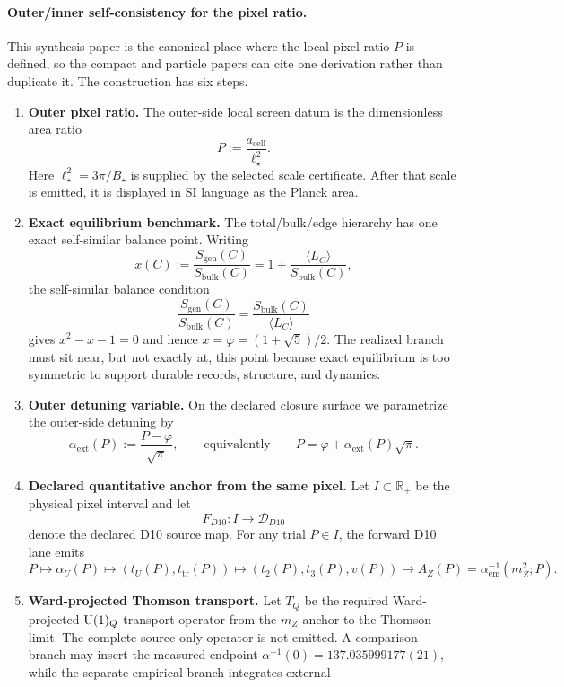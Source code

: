 \paragraph{Outer/inner self-consistency for the pixel ratio.}\label{sec:p-closure}
This synthesis paper is the canonical place where the local pixel ratio \(P\) is defined, so the
compact and particle papers can cite one derivation rather than duplicate it. The construction has
six steps.
\begin{enumerate}[leftmargin=2em]
\item \textbf{Outer pixel ratio.} The outer-side local screen datum is the dimensionless area
ratio
\[
P:=\frac{a_{\mathrm{cell}}}{\ell_\star^2}.
\]
Here \(\ell_\star^2=3\pi/B_\star\) is supplied by the selected scale certificate. After that scale
is emitted, it is displayed in SI language as the Planck area.
\item \textbf{Exact equilibrium benchmark.} The total/bulk/edge hierarchy has one exact
self-similar balance point. Writing
\[
x(C):=\frac{S_{\mathrm{gen}}(C)}{S_{\mathrm{bulk}}(C)}
=
1+\frac{\langle L_C\rangle}{S_{\mathrm{bulk}}(C)},
\]
the self-similar balance condition
\[
\frac{S_{\mathrm{gen}}(C)}{S_{\mathrm{bulk}}(C)}
=
\frac{S_{\mathrm{bulk}}(C)}{\langle L_C\rangle}
\]
gives \(x^2-x-1=0\) and hence \(x=\varphi=(1+\sqrt5)/2\). The realized branch must sit near, but
not exactly at, this point because exact equilibrium is too symmetric to support durable records,
structure, and dynamics.
\item \textbf{Outer detuning variable.} On the declared closure surface we parametrize
the outer-side detuning by
\[
\alpha_{\mathrm{ext}}(P):=\frac{P-\varphi}{\sqrt{\pi}},
\qquad\text{equivalently}\qquad
P=\varphi+\alpha_{\mathrm{ext}}(P)\sqrt{\pi}.
\]
\item \textbf{Declared quantitative anchor from the same pixel.} Let \(I\subset\mathbb R_+\) be
the physical pixel interval and let
\[
F_{D10}:I\longrightarrow\mathcal D_{D10}
\]
denote the declared D10 source map. For any trial \(P\in I\), the forward D10 lane emits
\[
P\longmapsto \alpha_U(P)\longmapsto (t_U(P),t_{\mathrm{tr}}(P))
\longmapsto (t_2(P),t_3(P),v(P))
\longmapsto A_Z(P)=\alpha_{\mathrm{em}}^{-1}(m_Z^2;P).
\]
\item \textbf{Ward-projected Thomson transport.} Let \(T_Q\) be the required Ward-projected
\(\mathrm{U}(1)_Q\) transport operator from the \(m_Z\)-anchor to the Thomson limit. The complete
source-only operator is not emitted. A comparison branch may insert the measured endpoint
\(\alpha^{-1}(0)=137.035999177(21)\), while the separate empirical branch integrates external

\end{enumerate}
